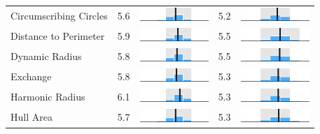 \begin{table}
\begin{tabular}{l rm{7em} rm{7em}}
Circumscribing Circles &   5.6 &        \includegraphics[width=7em]{mini_hist/NC_2012_reock} &   5.2 &        \includegraphics[width=7em]{mini_hist/NC_2016_reock} \\
Distance to Perimeter  &   5.9 &     \includegraphics[width=7em]{mini_hist/NC_2012_rohrbach} &   5.5 &     \includegraphics[width=7em]{mini_hist/NC_2016_rohrbach} \\
Dynamic Radius         &   5.8 &   \includegraphics[width=7em]{mini_hist/NC_2012_dyn_radius} &   5.5 &   \includegraphics[width=7em]{mini_hist/NC_2016_dyn_radius} \\
Exchange               &   5.8 &     \includegraphics[width=7em]{mini_hist/NC_2012_exchange} &   5.3 &     \includegraphics[width=7em]{mini_hist/NC_2016_exchange} \\
Harmonic Radius        &   6.1 &  \includegraphics[width=7em]{mini_hist/NC_2012_harm_radius} &   5.3 &  \includegraphics[width=7em]{mini_hist/NC_2016_harm_radius} \\
Hull Area              &   5.7 &       \includegraphics[width=7em]{mini_hist/NC_2012_hull_a} &   5.3 &       \includegraphics[width=7em]{mini_hist/NC_2016_hull_a} \\

\end{tabular}
\end{table}
